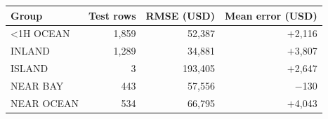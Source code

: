 \begin{tabular}{lrrr}
\toprule
Group & Test rows & RMSE (USD) & Mean error (USD) \\
\midrule
<1H OCEAN & 1,859 & 52,387 & $+$2,116 \\
INLAND & 1,289 & 34,881 & $+$3,807 \\
ISLAND & 3 & 193,405 & $+$2,647 \\
NEAR BAY & 443 & 57,556 & $-$130 \\
NEAR OCEAN & 534 & 66,795 & $+$4,043 \\
\bottomrule
\end{tabular}
